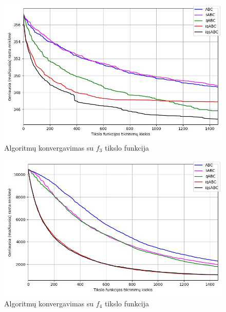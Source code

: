 \documentclass{VUMIFPSmagistrinis}
\begin{document}
\begin{landscape}
\begin{multicols}{2}
\begin{figure}[H]
    \centering
    \includegraphics[scale=0.45]{img/2kv/all_f3.jpg}
    \caption{Algoritmų konvergavimas su $f_{3}$ tikslo funkcija}
    \label{img:konf3}
\end{figure}


\begin{figure}[H]
    \centering
    \includegraphics[scale=0.45]{img/2kv/all_f4.jpg}
    \caption{Algoritmų konvergavimas su $f_{4}$ tikslo funkcija}
    \label{img:konf4}
\end{figure}






\end{multicols}
\begin{multicols}{2}


\end{multicols}
\end{landscape}
\end{document}
